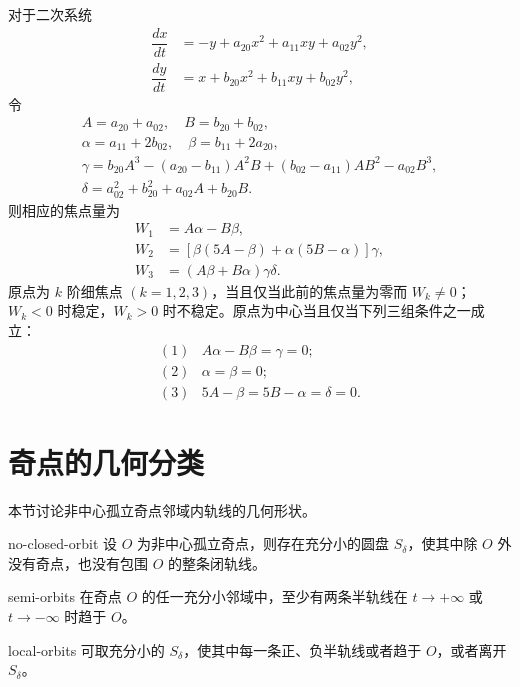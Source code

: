 对于二次系统
\[
\begin{aligned}
\dfrac{dx}{dt}&=-y+a_{20}x^2+a_{11}xy+a_{02}y^2,\\
\dfrac{dy}{dt}&=x+b_{20}x^2+b_{11}xy+b_{02}y^2,
\end{aligned}
\tag{5.28}
\]
令
\[
\begin{gathered}
A=a_{20}+a_{02},\quad B=b_{20}+b_{02},\\
\alpha=a_{11}+2b_{02},\quad \beta=b_{11}+2a_{20},\\
\gamma=b_{20}A^3-(a_{20}-b_{11})A^2B
 +(b_{02}-a_{11})AB^2-a_{02}B^3,\\
\delta=a_{02}^2+b_{20}^2+a_{02}A+b_{20}B.
\end{gathered}
\tag{5.30}
\]
则相应的焦点量为
\[
\begin{aligned}
W_1&=A\alpha-B\beta,\\
W_2&=[\beta(5A-\beta)+\alpha(5B-\alpha)]\gamma,\\
W_3&=(A\beta+B\alpha)\gamma\delta.
\end{aligned}
\tag{5.29}
\]
原点为 $k$ 阶细焦点 $(k=1,2,3)$，当且仅当此前的焦点量为零而 $W_k\ne0$；$W_k<0$ 时稳定，$W_k>0$ 时不稳定。原点为中心当且仅当下列三组条件之一成立：
\[
\begin{array}{ll}
(1)&A\alpha-B\beta=\gamma=0;\\
(2)&\alpha=\beta=0;\\
(3)&5A-\beta=5B-\alpha=\delta=0.
\end{array}
\]

\section{奇点的几何分类}
本节讨论非中心孤立奇点邻域内轨线的几何形状。

\begin{theorem}{}{no-closed-orbit}
设 $O$ 为非中心孤立奇点，则存在充分小的圆盘 $S_\delta$，使其中除 $O$ 外没有奇点，也没有包围 $O$ 的整条闭轨线。
\end{theorem}


\begin{theorem}{}{semi-orbits}
在奇点 $O$ 的任一充分小邻域中，至少有两条半轨线在 $t\to+\infty$ 或 $t\to-\infty$ 时趋于 $O$。
\end{theorem}

\begin{theorem}{}{local-orbits}
可取充分小的 $S_\delta$，使其中每一条正、负半轨线或者趋于 $O$，或者离开 $S_\delta$。
\end{theorem}

